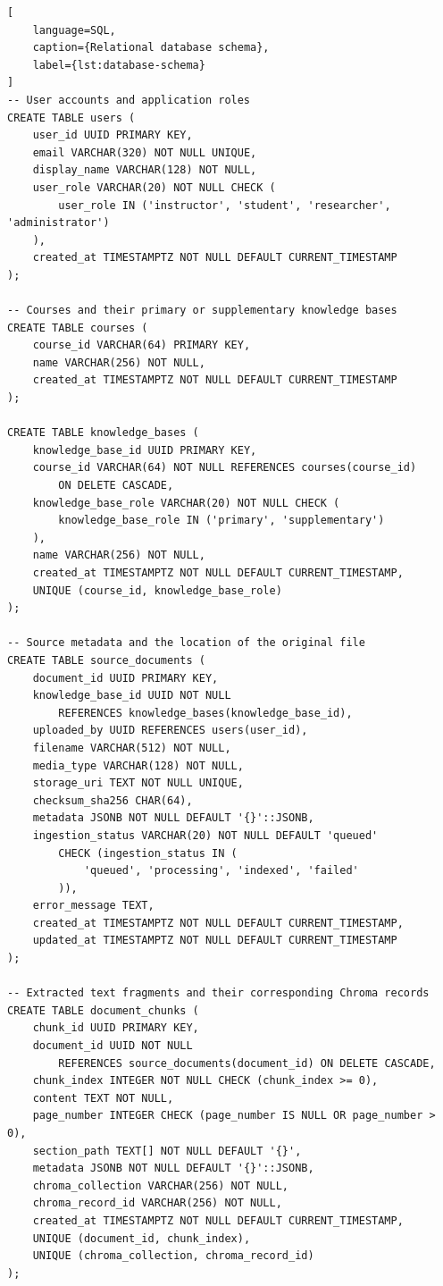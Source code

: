 \documentclass[12pt,a4paper]{article}
\begin{document}
\begin{lstlisting}[
    language=SQL,
    caption={Relational database schema},
    label={lst:database-schema}
]
-- User accounts and application roles
CREATE TABLE users (
    user_id UUID PRIMARY KEY,
    email VARCHAR(320) NOT NULL UNIQUE,
    display_name VARCHAR(128) NOT NULL,
    user_role VARCHAR(20) NOT NULL CHECK (
        user_role IN ('instructor', 'student', 'researcher', 'administrator')
    ),
    created_at TIMESTAMPTZ NOT NULL DEFAULT CURRENT_TIMESTAMP
);

-- Courses and their primary or supplementary knowledge bases
CREATE TABLE courses (
    course_id VARCHAR(64) PRIMARY KEY,
    name VARCHAR(256) NOT NULL,
    created_at TIMESTAMPTZ NOT NULL DEFAULT CURRENT_TIMESTAMP
);

CREATE TABLE knowledge_bases (
    knowledge_base_id UUID PRIMARY KEY,
    course_id VARCHAR(64) NOT NULL REFERENCES courses(course_id)
        ON DELETE CASCADE,
    knowledge_base_role VARCHAR(20) NOT NULL CHECK (
        knowledge_base_role IN ('primary', 'supplementary')
    ),
    name VARCHAR(256) NOT NULL,
    created_at TIMESTAMPTZ NOT NULL DEFAULT CURRENT_TIMESTAMP,
    UNIQUE (course_id, knowledge_base_role)
);

-- Source metadata and the location of the original file
CREATE TABLE source_documents (
    document_id UUID PRIMARY KEY,
    knowledge_base_id UUID NOT NULL
        REFERENCES knowledge_bases(knowledge_base_id),
    uploaded_by UUID REFERENCES users(user_id),
    filename VARCHAR(512) NOT NULL,
    media_type VARCHAR(128) NOT NULL,
    storage_uri TEXT NOT NULL UNIQUE,
    checksum_sha256 CHAR(64),
    metadata JSONB NOT NULL DEFAULT '{}'::JSONB,
    ingestion_status VARCHAR(20) NOT NULL DEFAULT 'queued'
        CHECK (ingestion_status IN (
            'queued', 'processing', 'indexed', 'failed'
        )),
    error_message TEXT,
    created_at TIMESTAMPTZ NOT NULL DEFAULT CURRENT_TIMESTAMP,
    updated_at TIMESTAMPTZ NOT NULL DEFAULT CURRENT_TIMESTAMP
);

-- Extracted text fragments and their corresponding Chroma records
CREATE TABLE document_chunks (
    chunk_id UUID PRIMARY KEY,
    document_id UUID NOT NULL
        REFERENCES source_documents(document_id) ON DELETE CASCADE,
    chunk_index INTEGER NOT NULL CHECK (chunk_index >= 0),
    content TEXT NOT NULL,
    page_number INTEGER CHECK (page_number IS NULL OR page_number > 0),
    section_path TEXT[] NOT NULL DEFAULT '{}',
    metadata JSONB NOT NULL DEFAULT '{}'::JSONB,
    chroma_collection VARCHAR(256) NOT NULL,
    chroma_record_id VARCHAR(256) NOT NULL,
    created_at TIMESTAMPTZ NOT NULL DEFAULT CURRENT_TIMESTAMP,
    UNIQUE (document_id, chunk_index),
    UNIQUE (chroma_collection, chroma_record_id)
);


\end{lstlisting}
\end{document}
